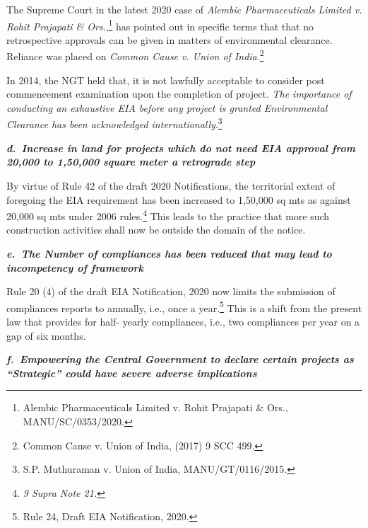 \begin{multicols}{2}
\vspace{-.05cm}

\noi
The Supreme Court in the latest 2020 case of \textit{Alembic Pharmaceuticals Limited v. Rohit
Prajapati \& Ors}.,\footnote{Alembic Pharmaceuticals Limited v. Rohit Prajapati \& Ors., MANU/SC/0353/2020.} has pointed out in specific terms that that no retrospective approvals can
be given in matters of environmental clearance. Reliance was placed on \textit{Common Cause v.
Union of India}.\footnote{Common Cause v. Union of India, (2017) 9 SCC 499.} 

\vspace{.5cm}
\noi
In 2014, the NGT held that, it is not lawfully acceptable to consider post commencement
examination upon the completion of project. \textit{The importance of conducting an exhaustive EIA
before any project is granted Environmental Clearance has been acknowledged
internationally}.\footnote{S.P. Muthuraman v. Union of India, MANU/GT/0116/2015.}

\vspace{-.02cm}

\noi
{\large\it\bfseries d.~Increase in land for projects which do not need EIA approval from 20,000 to 1,50,000 square meter a retrograde step}

\vspace{-.05cm}

\noi
By virtue of Rule 42 of the draft 2020 Notifications, the territorial extent of foregoing the
EIA requirement has been increased to 1,50,000 sq mts as against 20,000 sq mts under 2006
rules.\footnote{\textit{9 Supra Note 21.}} This leads to the practice that more such construction activities shall now be outside
the domain of the notice.

\vspace{-.02cm}
\noi
{\large\it\bfseries e.~The Number of compliances has been reduced that may lead to incompetency of framework }

\vspace{-.05cm}

\noi
Rule 20 (4) of the draft EIA Notification, 2020 now limits the submission of compliances
reports to annually, i.e., once a year.\footnote{Rule 24, Draft EIA Notification, 2020.} This is a shift from the present law that provides for
half- yearly compliances, i.e., two compliances per year on a gap of six months. 

\vspace{-.02cm}
\noi
{\large\it\bfseries f.~Empowering the Central Government to declare certain projects as “Strategic” could have severe adverse implications}


\end{multicols}
